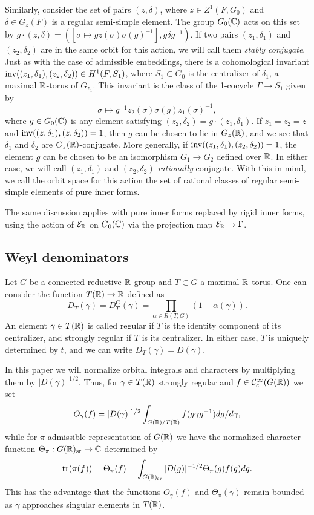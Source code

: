 \documentclass{article}
\theoremstyle{definition}
\numberwithin{equation}{section}
\renewcommand{\-}{\hyp{}}
\begin{document}
Similarly, consider the set of pairs $(z,\delta)$, where $z \in Z^1(F,G_0)$ and $\delta \in G_z(F)$ is a regular semi-simple element. The group $G_0(\mathbb{C})$ acts on this set by $g\cdot (z,\delta)=([\sigma \mapsto gz(\sigma)\sigma(g)^{-1}],g\delta g^{-1})$. If two pairs $(z_1,\delta_1)$ and $(z_2,\delta_2)$ are in the same orbit for this action, we will call them \emph{stably conjugate}. Just as with the case of admissible embeddings, there is a cohomological invariant $\textrm{inv}((z_1,\delta_1),(z_2,\delta_2)) \in H^1(F,S_1)$, where $S_1 \subset G_0$ is the centralizer of $\delta_1$, a maximal $\mathbb{R}$-torus of $G_{z_1}$. This invariant is the class of the 1-cocycle $\Gamma \to S_1$ given by
\[ \sigma \mapsto g^{-1}z_2(\sigma)\sigma(g)z_1(\sigma)^{-1}, \]
where $g \in G_0(\mathbb{C})$ is any element satisfying $(z_2,\delta_2)=g \cdot (z_1,\delta_1)$. If $z_1=z_2=z$ and $\textrm{inv}((z,\delta_1),(z,\delta_2))=1$, then $g$ can be chosen to lie in $G_z(\mathbb{R})$, and we see that $\delta_1$ and $\delta_2$ are $G_z(\mathbb{R})$-conjugate. More generally, if $\textrm{inv}((z_1,\delta_1),(z_2,\delta_2))=1$, the element $g$ can be chosen to be an isomorphism $G_1 \to G_2$ defined over $\mathbb{R}$. In either case, we will call $(z_1,\delta_1)$ and $(z_2,\delta_2)$ \emph{rationally} conjugate. With this in mind, we call the orbit space for this action the set of rational classes of regular semi-simple elements of pure inner forms. 

The same discussion applies with pure inner forms replaced by rigid inner forms, using the action of $\mathcal{E}_{\mathbb{R}}$ on $G_0(\mathbb{C})$ via the projection map $\mathcal{E}_{\mathbb{R}} \to \Gamma$.

\subsection{Weyl denominators} \label{sub:weyldenom}

Let $G$ be a connected reductive $\mathbb{R}$-group and $T \subset G$ a maximal $\mathbb{R}$-torus. One can consider the function $T(\mathbb{R}) \to \mathbb{R}$ defined as
\[ D_T(\gamma) = D_T^G(\gamma) = \textstyle\prod\limits_{\alpha \in R(T,G)} (1-\alpha(\gamma)). \]
An element $\gamma \in T(\mathbb{R})$ is called regular if $T$ is the identity component of its centralizer, and strongly regular if $T$ is its centralizer. In either case, $T$ is uniquely determined by $t$, and we can write $D_T(\gamma)=D(\gamma)$.

In this paper we will normalize orbital integrals and characters by multiplying them by $|D(\gamma)|^{1/2}$. Thus, for $\gamma \in T(\mathbb{R})$ strongly regular and $f \in \mathcal{C}_c^\infty(G(\mathbb{R}))$ we set
\begin{equation} \label{eq:normorb}
	O_\gamma(f) = |D(\gamma)|^{1/2}\int_{G(\mathbb{R})/T(\mathbb{R})} f(g\gamma g^{-1})dg/d\gamma,
\end{equation}
while for $\pi$ admissible representation of $G(\mathbb{R})$ we have the normalized character function $\Theta_\pi : G(\mathbb{R})_{\textrm{sr}} \to \mathbb{C}$ determined by
\begin{equation} \label{eq:normchar}
	\textrm{tr}(\pi(f)) = \Theta_\pi(f) = \int_{G(\mathbb{R})_{\textrm{sr}}} |D(g)|^{-1/2}\Theta_\pi(g)f(g)dg. 
\end{equation}
This has the advantage that the functions $O_\gamma(f)$ and $\Theta_\pi(\gamma)$  remain bounded as $\gamma$ approaches singular elements in $T(\mathbb{R})$.
\end{document}
